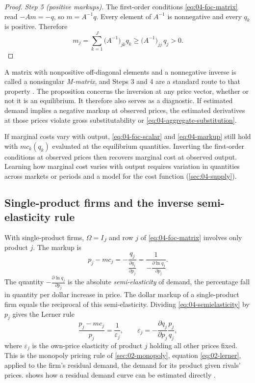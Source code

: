 \begin{proof}
\emph{Step 5 (positive markups).} The first-order conditions \eqref{eq:04-foc-matrix} read $-Am = -q$, so
$m = A^{-1}q$. Every element of $A^{-1}$ is nonnegative and every $q_k$ is positive. Therefore
\begin{equation*}
m_j = \sum_{k = 1}^{J}\big(A^{-1}\big)_{jk}q_k \ge \big(A^{-1}\big)_{jj}\,q_j > 0.
\end{equation*}
\end{proof}

A matrix with nonpositive off-diagonal elements and a nonnegative inverse is called a nonsingular
\emph{M-matrix}, and Steps 3 and 4 are a standard route to that property \citep{BermanPlemmons1994}. The
proposition concerns the inversion at any price vector, whether or not it is an equilibrium. It therefore also
serves as a diagnostic. If estimated demand implies a negative markup at observed prices, the estimated
derivatives at those prices violate gross substitutability or \eqref{eq:04-aggregate-substitution}.

If marginal costs vary with output, \eqref{eq:04-foc-scalar} and \eqref{eq:04-markup} still hold with
$mc_k(q_k)$ evaluated at the equilibrium quantities. Inverting the first-order conditions at observed prices then
recovers marginal cost at observed output. Learning how marginal cost varies with output requires variation in
quantities across markets or periods and a model for the cost function (\cref{sec:04-supply}).

\subsection{Single-product firms and the inverse semi-elasticity rule}\label{sec:04-bertrand-single}

With single-product firms, $\Omega = I_J$ and row $j$ of \eqref{eq:04-foc-matrix} involves only product $j$. The
markup is
\begin{equation}\label{eq:04-semielasticity}
p_j - mc_j = -\frac{q_j}{\frac{\partial q_j}{\partial p_j}} = \frac{1}{-\frac{\partial\ln q_j}{\partial p_j}}.
\end{equation}
The quantity $-\frac{\partial\ln q_j}{\partial p_j}$ is the absolute \emph{semi-elasticity} of demand, the
percentage fall in quantity per dollar increase in price. The dollar markup of a single-product firm equals the
reciprocal of this semi-elasticity. Dividing \eqref{eq:04-semielasticity} by $p_j$ gives the Lerner rule
\begin{equation*}
\frac{p_j - mc_j}{p_j} = \frac{1}{\varepsilon_j},
\qquad
\varepsilon_j = -\frac{\partial q_j}{\partial p_j}\frac{p_j}{q_j},
\end{equation*}
where $\varepsilon_j$ is the own-price elasticity of product $j$ holding all other prices fixed. This is the
monopoly pricing rule of \cref{sec:02-monopoly}, equation \eqref{eq:02-lerner}, applied to the firm's residual demand, the
demand for its product given rivals' prices.  shows how a residual demand curve can
be estimated directly \citep{BakerBresnahan1988}.

